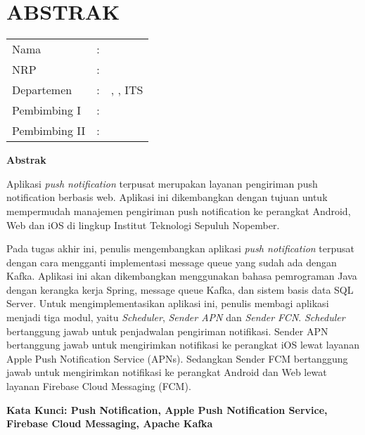 \chapter {ABSTRAK}


\noindent\textbf{\MakeUppercase\judul}
\vspace*{1em}

\begin{tabularx}{\linewidth}{ l l X }
	Nama 			& : & \penulis \\
	NRP 			& :	& \nrp \\
	Departemen 		& : & \jurusan, \newline \fakultas, ITS \\
	Pembimbing I 	& : & \pembimbingsatu \\
	Pembimbing II 	& : & \pembimbingdua
	\vspace*{1em} 	%
\end {tabularx}

\noindent\textbf{Abstrak} \\
\itshape
\par Aplikasi \textit{push notification} terpusat merupakan layanan pengiriman push notification berbasis web. Aplikasi ini dikembangkan dengan tujuan untuk mempermudah manajemen pengiriman push notification ke perangkat Android, Web dan iOS di lingkup Institut Teknologi Sepuluh Nopember.
\par Pada tugas akhir ini, penulis mengembangkan aplikasi \textit{push notification} terpusat dengan cara mengganti implementasi message queue yang sudah ada dengan Kafka. Aplikasi ini akan dikembangkan menggunakan bahasa pemrograman Java dengan kerangka kerja Spring, message queue Kafka, dan sistem basis data SQL Server. Untuk mengimplementasikan aplikasi ini, penulis membagi aplikasi menjadi tiga modul, yaitu \textit{Scheduler}, \textit{Sender APN} dan \textit{Sender FCN}. \textit{Scheduler} bertanggung jawab untuk penjadwalan pengiriman notifikasi. Sender APN bertanggung jawab untuk mengirimkan notifikasi ke perangkat iOS lewat layanan Apple Push Notification Service (APNs). Sedangkan Sender FCM bertanggung jawab untuk mengirimkan notifikasi ke perangkat Android dan Web lewat layanan Firebase Cloud Messaging (FCM).

\vspace*{1em}
\noindent\bfseries Kata Kunci: Push Notification, Apple Push Notification Service, Firebase Cloud Messaging, Apache Kafka
\normalfont
\cleardoublepage

